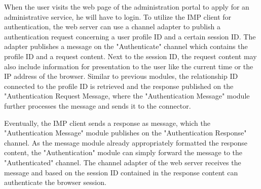 When the user visits the web page of the administration portal to apply for an administrative service, he will have to login. To utilize the IMP client for authentication, the web server can use a channel adapter to publish a authentication request concerning a user profile ID and a certain session ID. The adapter publishes a message on the "Authenticate" channel which contains the profile ID and a request content. Next to the session ID, the request content may also include information for presentation to the user like the current time or the IP address of the browser. Similar to previous modules, the relationship ID connected to the profile ID is retrieved and the response published on the "Authentication Request Message, where the "Authentication Message" module further processes the message and sends it to the connector.

Eventually, the IMP client sends a response as message, which the "Authentication Message" module publishes on the "Authentication Response" channel. As the message module already appropriately formatted the response content, the "Authentication" module can simply forward the message to the "Authenticated" channel. The channel adapter of the web server receives the message and based on the session ID contained in the response content can authenticate the browser session.